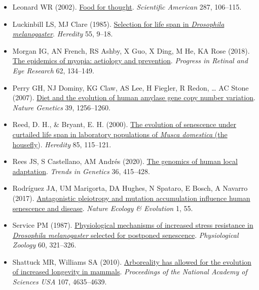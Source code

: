 \documentclass[
]{book}
\begin{document}
\begin{itemize}
\item
  Leonard WR (2002). \href{https://www.jstor.org/stable/26060086}{Food for thought}. \emph{Scientific American} 287, 106--115.
\item
  Luckinbill LS, MJ Clare (1985). \href{https://www.nature.com/articles/hdy198566}{Selection for life span in \emph{Drosophila melanogaster}}. \emph{Heredity} 55, 9--18.
\item
  Morgan IG, AN French, RS Ashby, X Guo, X Ding, M He, KA Rose (2018). \href{https://www.sciencedirect.com/science/article/abs/pii/S1350946217300393?via\%3Dihub}{The epidemics of myopia: aetiology and prevention}. \emph{Progress in Retinal and Eye Research} 62, 134--149.
\item
  Perry GH, NJ Dominy, KG Claw, AS Lee, H Fiegler, R Redon, \ldots{} AC Stone (2007). \href{https://www.nature.com/articles/ng2123}{Diet and the evolution of human amylase gene copy number variation}. \emph{Nature Genetics} 39, 1256--1260.
\item
  Reed, D. H., \& Bryant, E. H. (2000). \href{https://www.nature.com/articles/6887370}{The evolution of senescence under curtailed life span in laboratory populations of \emph{Musca domestica} (the housefly}). \emph{Heredity} 85, 115--121.
\item
  Rees JS, S Castellano, AM Andrés (2020). \href{https://www.cell.com/trends/genetics/fulltext/S0168-9525(20)30070-6}{The genomics of human local adaptation}. \emph{Trends in Genetics} 36, 415--428.
\item
  Rodríguez JA, UM Marigorta, DA Hughes, N Spataro, E Bosch, A Navarro (2017). \href{Rodríguez,\%20J.\%20A.,\%20Marigorta,\%20U.\%20M.,\%20Hughes,\%20D.\%20A.,\%20Spataro,\%20N.,\%20Bosch,\%20E.,\%20\&\%20Navarro,\%20A.\%20(2017).\%20Antagonistic\%20pleiotropy\%20and\%20mutation\%20accumulation\%20influence\%20human\%20senescence\%20and\%20disease.\%20Nature\%20Ecology\%20\&\%20Evolution,\%201(3),\%2055.}{Antagonistic pleiotropy and mutation accumulation influence human senescence and disease}. \emph{Nature Ecology \& Evolution} 1, 55.
\item
  Service PM (1987). \href{https://www.journals.uchicago.edu/doi/10.1086/physzool.60.3.30162285}{Physiological mechanisms of increased stress resistance in \emph{Drosophila melanogaster} selected for postponed senescence}. \emph{Physiological Zoology} 60, 321--326.
\item
  Shattuck MR, Williams SA (2010). \href{https://www.pnas.org/content/107/10/4635}{Arboreality has allowed for the evolution of increased longevity in mammals}. \emph{Proceedings of the National Academy of Sciences USA} 107, 4635--4639.

\end{itemize}
\end{document}
